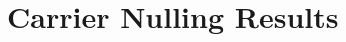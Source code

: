 \documentclass[12pt]{iopart}
\begin{document}





\section{Carrier Nulling Results}
\end{document}
